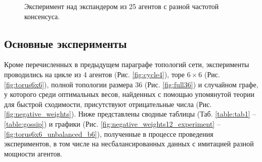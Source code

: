 \documentclass[a4paper,article,14pt]{extarticle}
\begin{document}
\begin{figure}[H]
\begin{center}
\caption{ \label{fig:expander25experiment}
     Эксперимент над экспандером из 25 агентов с разной частотой консенсуса.}
\end{center}
\end{figure}


\subsection{Основные эксперименты}
\label{section:main_experiments}

Кроме перечисленных в предыдущем параграфе топологий сети, эксперименты проводились на цикле из 4 агентов (Рис. \ref{fig:cycle4}), торе $6\times 6$ (Рис. \ref{fig:torus6x6}), полной топологии размера 36 (Рис. \ref{fig:full36}) и случайном графе, у которого среди оптимальных весов, найденных с помощью упомянутой теории для быстрой сходимости, присутствуют отрицательные числа (Рис. \ref{fig:negative_weights}).
Ниже представлены сводные таблицы (Таб. \ref{table:tab1} -- \ref{table:gossip}) и графики (Рис. \ref{fig:negative_weights12_experiment} -- \ref{fig:torus6x6_unbalanced_b6}), полученные в процессе проведения экспериментов, в том числе на несбалансированных данных с имитацией разной мощности агентов.
\end{document}
